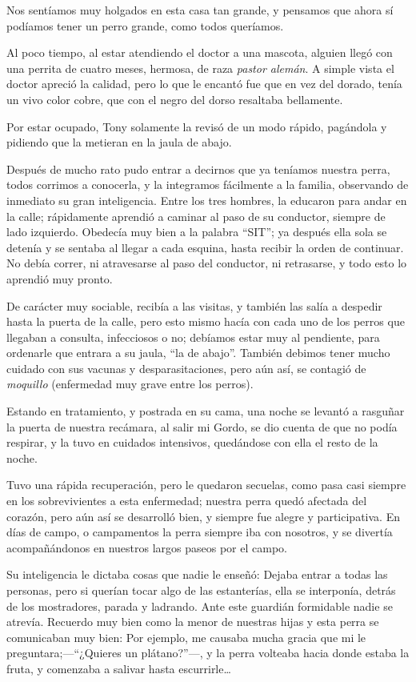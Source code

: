 \documentclass[letterpaper, 12pt]{book}
\begin{document}
Nos sentíamos muy holgados en esta casa tan grande, y pensamos  que ahora sí podíamos tener un perro grande, como todos queríamos.

Al poco tiempo, al estar atendiendo el doctor a una mascota, alguien llegó con una perrita de cuatro meses, hermosa, de raza \textit{pastor alemán}. A simple vista el doctor apreció la calidad, pero lo que le encantó fue que en vez del dorado, tenía un vivo color cobre, que con el negro del dorso resaltaba bellamente.

Por estar ocupado, Tony solamente la revisó de un modo rápido, pagándola y pidiendo que la metieran en la jaula de abajo.

Después de mucho rato pudo entrar a decirnos que ya teníamos nuestra perra, todos corrimos a conocerla, y la integramos fácilmente a la familia, observando de inmediato su gran inteligencia. Entre los tres hombres, la educaron para andar en la calle; rápidamente aprendió a caminar al paso de su conductor, siempre de lado izquierdo. Obedecía muy bien a la palabra ``SIT''; ya después ella sola se detenía y se sentaba al llegar a cada esquina, hasta recibir la orden de continuar. No debía correr, ni atravesarse al paso del conductor, ni retrasarse, y todo esto lo aprendió muy pronto. 

De carácter muy sociable, recibía a las visitas, y también las salía a despedir hasta la puerta de la calle, pero esto mismo hacía con cada uno de los perros que llegaban a consulta, infecciosos o no; debíamos estar muy al pendiente, para ordenarle que entrara a su jaula, ``la de abajo''. También debimos tener mucho cuidado con sus vacunas y desparasitaciones, pero aún así, se contagió de \textit{moquillo} (enfermedad muy grave entre los perros).

Estando en tratamiento, y postrada en su cama, una noche se levantó a rasguñar la puerta de nuestra recámara, al salir mi Gordo, se dio cuenta de que no podía respirar, y  la tuvo en cuidados intensivos, quedándose con ella el resto de la noche.

Tuvo una rápida recuperación, pero le quedaron secuelas, como pasa casi siempre en los sobrevivientes a esta enfermedad; nuestra perra quedó afectada del corazón, pero aún así se desarrolló bien, y siempre fue alegre y participativa. En días de campo, o campamentos la perra siempre iba con nosotros, y se divertía acompañándonos en nuestros largos paseos por el campo.

Su inteligencia le dictaba cosas que nadie le enseñó: Dejaba entrar a todas las personas, pero si querían tocar algo de las estanterías, ella se interponía, detrás de los mostradores, parada y ladrando. Ante este guardián formidable nadie se atrevía.
Recuerdo muy bien como la menor de nuestras hijas y esta perra se comunicaban muy bien: Por ejemplo, me causaba mucha gracia que mi le preguntara;---``¿Quieres un plátano?''---, y la perra volteaba hacia donde estaba la fruta, y comenzaba a salivar hasta escurrirle\ldots
\end{document}
